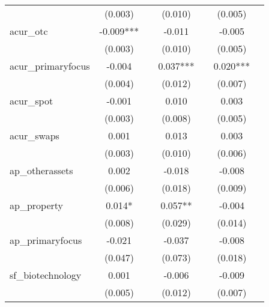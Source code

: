 {\begin{tabular}{l*{6}{c}}
            &     (0.003)   &               &     (0.010)   &               &     (0.005)   &               \\
[1em]
acur\_otc    &      -0.009***&               &      -0.011   &               &      -0.005   &               \\
            &     (0.003)   &               &     (0.010)   &               &     (0.005)   &               \\
[1em]
acur\_primaryfocus&      -0.004   &               &       0.037***&               &       0.020***&               \\
            &     (0.004)   &               &     (0.012)   &               &     (0.007)   &               \\
[1em]
acur\_spot   &      -0.001   &               &       0.010   &               &       0.003   &               \\
            &     (0.003)   &               &     (0.008)   &               &     (0.005)   &               \\
[1em]
acur\_swaps  &       0.001   &               &       0.013   &               &       0.003   &               \\
            &     (0.003)   &               &     (0.010)   &               &     (0.006)   &               \\
[1em]
ap\_otherassets&       0.002   &               &      -0.018   &               &      -0.008   &               \\
            &     (0.006)   &               &     (0.018)   &               &     (0.009)   &               \\
[1em]
ap\_property &       0.014*  &               &       0.057** &               &      -0.004   &               \\
            &     (0.008)   &               &     (0.029)   &               &     (0.014)   &               \\
[1em]
ap\_primaryfocus&      -0.021   &               &      -0.037   &               &      -0.008   &               \\
            &     (0.047)   &               &     (0.073)   &               &     (0.018)   &               \\
[1em]
sf\_biotechnology&       0.001   &               &      -0.006   &               &      -0.009   &               \\
            &     (0.005)   &               &     (0.012)   &               &     (0.007)   &               \\

\end{tabular}}

